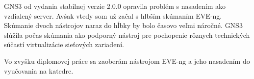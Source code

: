 GNS3 od vydania stabilnej verzie 2.0.0 opravila problém s nasadením ako vzdialený server. Avšak vtedy som už začal s hlbším skúmaním EVE-ng. Skúmanie dvoch nástrojov naraz do hĺbky by bolo časovo veľmi náročné. GNS3 slúžila počas skúmania ako podporný nástroj pre pochopenie rôznych technických súčastí virtualizácie sieťových zariadení.

Vo zvyšku diplomovej práce sa zaoberám nástrojom EVE-ng a jeho nasadením do vyučovania na katedre.
